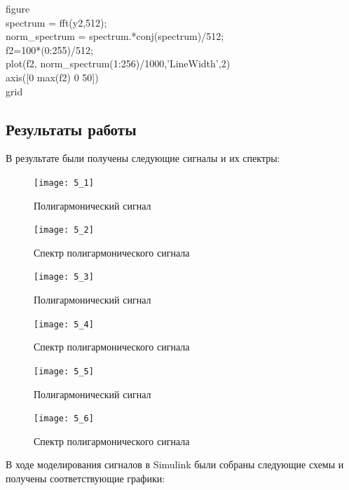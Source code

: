 \documentclass[10pt,a4paper]{article}
\begin{document}
\begin{flushleft}
figure\\
spectrum = fft(y2,512);\\
norm\_spectrum = spectrum.*conj(spectrum)/512;\\
f2=100*(0:255)/512;\\
plot(f2, norm\_spectrum(1:256)/1000,'LineWidth',2)\\
axis([0 max(f2) 0 50])\\
grid\\
\end{flushleft}
\subsection{Результаты работы}
В результате были получены следующие сигналы и их спектры:


\begin{figure}[h]\centering
  \parbox[b]{0.49\textwidth}{\centering
    \texttt{[image: 5\_1]} 
    \caption{Полигармонический сигнал}\label{fig.l5_1}}
  \hfil\hfil 
  \begin{minipage}[b]{0.49\textwidth}
	\centering
	\texttt{[image: 5\_2]}
	\caption{Спектр полигармонического сигнала}\label{fig.l5_2} 
  \end{minipage}
\end{figure}

\begin{figure}[h]\centering
  \parbox[b]{0.49\textwidth}{\centering
    \texttt{[image: 5\_3]} 
    \caption{Полигармонический сигнал}\label{fig.l5_3}}
  \hfil\hfil 
  \begin{minipage}[b]{0.49\textwidth}
	\centering
	\texttt{[image: 5\_4]}
	\caption{Спектр полигармонического сигнала}\label{fig.l5_4} 
  \end{minipage}
\end{figure}

\begin{figure}[h]\centering
  \parbox[b]{0.49\textwidth}{\centering
    \texttt{[image: 5\_5]} 
    \caption{Полигармонический сигнал}\label{fig.l5_5}}
  \hfil\hfil 
  \begin{minipage}[b]{0.49\textwidth}
	\centering
	\texttt{[image: 5\_6]}
	\caption{Спектр полигармонического сигнала}\label{fig.l5_6} 
  \end{minipage}
\end{figure}

\FloatBarrier

В ходе моделирования сигналов в Simulink были собраны следующие схемы и получены соответствующие графики:
\end{document}
